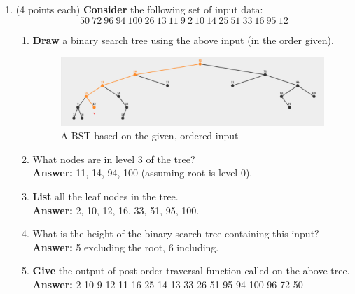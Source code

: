 \documentclass[12pt, a4paper]{article}
\newcommand{\squeezeup}{\vspace{-16pt}}%
\begin{document}
\begin{enumerate}
    \newpage



    \item (4 points each) \textbf{Consider} the following set of input data:
    \begin{equation*}
        50\ 72\ 96\ 94\ 100\ 26\ 13\ 11\ 9\ 2\ 10\ 14\ 25\ 51\ 33\ 16\ 95\ 12
    \end{equation*}
    
    \begin{enumerate}

        \item \textbf{Draw} a binary search tree using the above input (in the order given).
        \begin{figure}[H]
            \includegraphics[max width=\textwidth/2, center]{"6(a).png"}
            \caption{A BST based on the given, ordered input}
            \label{fig:6(a)-BST}
        \end{figure}\squeezeup
    
        \item What nodes are in level 3 of the tree? \\
        \hspace*{\fill} \textbf{Answer:} 11, 14, 94, 100 (assuming root is level 0).
        
        \item \textbf{List} all the leaf nodes in the tree. \\
        \hspace*{\fill} \textbf{Answer:} 2, 10, 12, 16, 33, 51, 95, 100.
        
        \item What is the height of the binary search tree containing this input? \\
        \hspace*{\fill} \textbf{Answer:} 5 excluding the root, 6 including.
        
        \item \textbf{Give} the output of post-order traversal function called on the above tree. \\
        \hspace*{\fill} \textbf{Answer:} 2 10 9 12 11 16 25 14 13 33 26 51 95 94 100 96 72 50
        

\end{enumerate}
\end{enumerate}
\end{document}
